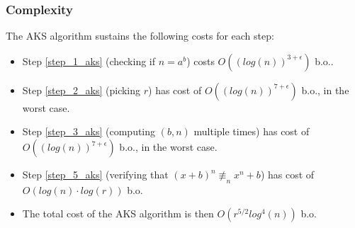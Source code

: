 \subsubsection{Complexity}
\begin{theorem}
    The AKS algorithm sustains the following costs for each step:
    \begin{itemize}
        \item Step \ref{step_1_aks} (checking if $n = a^{b}$) costs $O((log(n))^{3 + \epsilon})$ b.o..
        \item Step \ref{step_2_aks} (picking $r$) has cost of $O((log(n))^{7 + \epsilon})$ b.o., in the worst case.
        \item Step \ref{step_3_aks} (computing $(b,n)$ multiple times) has cost of $O((log(n))^{7 + \epsilon})$ b.o., in the worst case.
        \item Step \ref{step_5_aks} (verifying that $(x + b)^{n} \not\equiv_{n} x^{n} + b$) has cost of $O(log(n) \cdot log(r))$ b.o.
        \item The total cost of the AKS algorithm is then $O(r^{5/2} log^{4}(n))$ b.o.
    \end{itemize}
\end{theorem}
